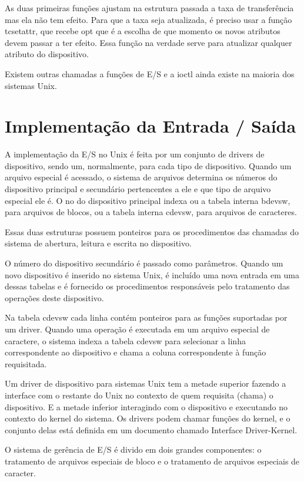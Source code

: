 As duas primeiras funções ajustam na estrutura passada a taxa de transferência mas ela não tem efeito. Para que a taxa seja atualizada, é preciso usar a função tcsetattr, que recebe opt que é a escolha de que momento os novos atributos devem passar a ter efeito. Essa função na verdade serve para atualizar qualquer atributo do dispositivo.

Existem outras chamadas a funções de E/S e a ioctl ainda existe na maioria dos sistemas Unix.

\section{Implementação da Entrada / Saída}

A implementação da E/S no Unix é feita por um conjunto de drivers de dispositivo, sendo um, normalmente, para cada tipo de dispositivo.
Quando um arquivo especial é acessado, o sistema de arquivos determina os números do dispositivo principal e secundário pertencentes a ele e que tipo de arquivo especial ele é. O no do dispositivo principal indexa ou a tabela interna bdevsw, para arquivos de blocos, ou a tabela interna cdevsw, para arquivos de caracteres.

Essas duas estruturas possuem ponteiros para os procedimentos das chamadas do sistema de abertura, leitura e escrita no dispositivo.

O número do dispositivo secundário é passado como parâmetros. Quando um novo dispositivo é inserido no sistema Unix, é incluído uma nova entrada em uma dessas tabelas e é fornecido os procedimentos responsáveis pelo tratamento das operações deste dispositivo.

Na tabela cdevsw cada linha contém ponteiros para as funções suportadas por um driver. Quando uma operação é executada em um arquivo especial de caractere, o sistema indexa a tabela cdevsw para selecionar a linha correspondente ao dispositivo e chama a coluna correspondente à função requisitada.

Um driver de dispositivo para sistemas Unix tem a metade superior fazendo a interface com o restante do Unix no contexto de quem requisita (chama) o dispositivo. E a metade inferior interagindo com o dispositivo e executando no contexto do kernel do sistema. Os drivers podem chamar funções do kernel, e o conjunto delas está definida em um documento chamado Interface Driver-Kernel.

O sistema de gerência de E/S é divido em dois grandes componentes: o tratamento de arquivos especiais de bloco e o tratamento de arquivos especiais de caracter.

